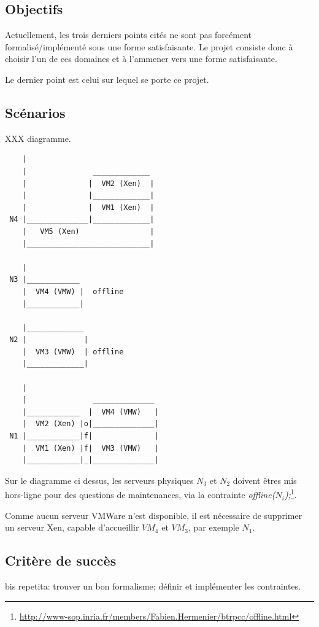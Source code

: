 \documentclass[a4paper]{article}
\begin{document}
\subsection{Objectifs}
Actuellement, les trois derniers points cités ne sont pas forcément
formalisé/implémenté sous une forme satisfaisante. Le projet consiste
donc à choisir l'un de ces domaines et à l'ammener vers une forme
satisfaisante.

Le dernier point est celui sur lequel se porte ce projet.
\subsection{Scénarios}
XXX diagramme.
\begin{verbatim}
    |
    |               _____________
    |              |  VM2 (Xen)  |
    |              |_____________|
    |              |  VM1 (Xen)  |
 N4 |______________|_____________|
    |   VM5 (Xen)                |
    |____________________________|

    |
 N3 |____________
    |  VM4 (VMW) |  offline
    |____________|

    |_____________
 N2 |             |
    |  VM3 (VMW)  | offline
    |_____________|

    |
    |               ______________
    |____________  |  VM4 (VMW)   |
    |  VM2 (Xen) |o|______________|
 N1 |____________|f|              |
    |  VM1 (Xen) |f|  VM3 (VMW)   |
    |____________|_|______________|

\end{verbatim}
Sur le diagramme ci dessus, les serveurs physiques $N_3$ et $N_2$ doivent êtres mis
hors-ligne pour des questions de maintenances, via la contrainte
\textit{offline($N_i$);}\footnote{\url{http://www-sop.inria.fr/members/Fabien.Hermenier/btrpcc/offline.html}}.

Comme aucun serveur VMWare n'est disponible, il est nécessaire de supprimer
un serveur Xen, capable d'accueillir $VM_4$ et $VM_3$, par exemple $N_1$.

\subsection{Critère de succès}
bis repetita: trouver un bon formalisme; définir et implémenter
les contraintes.
\end{document}
